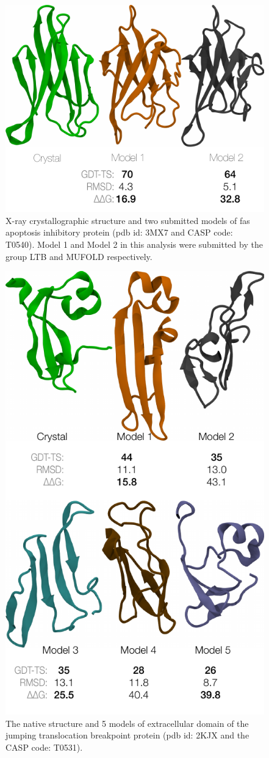 \documentclass[12pt]{article}
\begin{document}
\begin{figure}
\begin{center}
\includegraphics[width=3.5 in,height=3.0 in]{T0540.pdf}
\end{center}
\caption{X-ray crystallographic structure and two submitted models of fas apoptosis inhibitory protein (pdb id: 3MX7 and CASP code: T0540). 
Model 1 and Model 2 in this analysis were submitted by the group LTB and MUFOLD respectively.}
\label{fig:T0540}
\end{figure}

\begin{figure}
\begin{center}
\includegraphics[width=3.5 in,height=5.7 in]{T0531.pdf}
\end{center}
\caption{The native structure and 5 models of extracellular domain of the jumping translocation
breakpoint protein (pdb id: 2KJX and the CASP code: T0531).}
\label{fig:T0531}
\end{figure}
\end{document}
